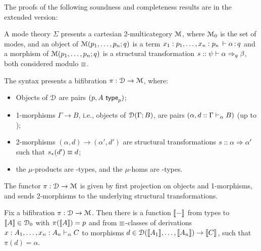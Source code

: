 The proofs of the following soundness and completeness results are in
the extended version:

\begin{theorem}
\label{thm:completeness-mode-theory}
A mode theory $\Sigma$ presents a cartesian 2-multicategory $\mathcal{M}$, where
$\mathcal{M}_0$ is the set of modes, and an object of $\mathcal{M}(p_1,\ldots,p_n;q)$ is a
term $x_1:p_1,\ldots,x_n:p_n \, \vdash \alpha \, \mathit{:} \, q$ and a morphism of $\mathcal{M}(p_1,\ldots,p_n;q)$ is a structural transformation
$s :: \psi \vdash \alpha \Rightarrow_{q} \beta$, both considered modulo $\equiv$.
\end{theorem}

\begin{theorem}
The syntax presents a bifibration $\pi : \mathcal{D} \to \mathcal{M}$, where:
\begin{itemize}
\item Objects of $\mathcal{D}$ are pairs $(p, A \,\, \mathsf{type}_{p})$;
\item 1-morphisms $\Gamma \to B$, i.e., objects of $\mathcal{D}(\Gamma; B)$, are pairs $(\alpha, d :: \Gamma \vdash_{\alpha} B)$ (up to \deq); 
\item 2-morphisms $(\alpha, d) \to (\alpha', d')$ are structural
  transformations $s :: \alpha \Rightarrow \alpha'$ such that $s_*(d') \equiv d$;
\item the $\mu$-products are \Fsymb-types, and the $\mu$-homs are \Usymb-types.
\end{itemize}
The functor $\pi : \mathcal{D} \to \mathcal{M}$ is given by first projection on objects and 1-morphisms, and sends 2-morphisms to the underlying structural transformations.
\end{theorem}

\begin{theorem}
Fix a bifibration $\pi : \mathcal{D} \to \mathcal{M}$.  Then there is a function $\llbracket -
\rrbracket$ from types  to $\llbracket A \rrbracket \in \mathcal{D}_0$ with $\pi(\llbracket
A \rrbracket) = p$ and from $\equiv$-classes of derivations $x:A_1, \ldots,
  x_n:A_n \vdash_{\alpha} C$ to morphisms $d \in \mathcal{D}(\llbracket A_1 \rrbracket, \dots, \llbracket
A_n \rrbracket) \to \llbracket C \rrbracket$, such that $\pi(d) = \alpha$.
\end{theorem}

